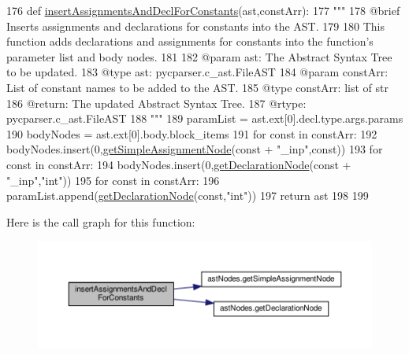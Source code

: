 \begin{DoxyCode}
176 \textcolor{keyword}{def }\hyperlink{namespaceutils_a694fa47d55cc41b3f9e86ab2f90e98f3}{insertAssignmentsAndDeclForConstants}(ast,constArr):
177     \textcolor{stringliteral}{"""
}
178 \textcolor{stringliteral}{    @brief Inserts assignments and declarations for constants into the AST.
}
179 \textcolor{stringliteral}{
}
180 \textcolor{stringliteral}{    This function adds declarations and assignments for constants into the function's parameter list and
       body nodes.
}
181 \textcolor{stringliteral}{
}
182 \textcolor{stringliteral}{    @param ast: The Abstract Syntax Tree to be updated.
}
183 \textcolor{stringliteral}{    @type ast: pycparser.c\_ast.FileAST
}
184 \textcolor{stringliteral}{    @param constArr: List of constant names to be added to the AST.
}
185 \textcolor{stringliteral}{    @type constArr: list of str
}
186 \textcolor{stringliteral}{    @return: The updated Abstract Syntax Tree.
}
187 \textcolor{stringliteral}{    @rtype: pycparser.c\_ast.FileAST
}
188 \textcolor{stringliteral}{    """}
189     paramList = ast.ext[0].decl.type.args.params
190     bodyNodes = ast.ext[0].body.block\_items
191     \textcolor{keywordflow}{for} const \textcolor{keywordflow}{in} constArr:
192         bodyNodes.insert(0,\hyperlink{namespaceastNodes_a2403f5d006e54f20e614226280cb6cbc}{getSimpleAssignmentNode}(const + \textcolor{stringliteral}{"\_inp"},const))
193     \textcolor{keywordflow}{for} const \textcolor{keywordflow}{in} constArr:
194         bodyNodes.insert(0,\hyperlink{namespaceastNodes_ae5e5c7f09a1586002b20db6d72f6d30b}{getDeclarationNode}(const + \textcolor{stringliteral}{"\_inp"},\textcolor{stringliteral}{"int"}))
195     \textcolor{keywordflow}{for} const \textcolor{keywordflow}{in} constArr:
196         paramList.append(\hyperlink{namespaceastNodes_ae5e5c7f09a1586002b20db6d72f6d30b}{getDeclarationNode}(const,\textcolor{stringliteral}{"int"}))
197     \textcolor{keywordflow}{return} ast
198 
199 
\end{DoxyCode}
Here is the call graph for this function\+:\nopagebreak
\begin{figure}[H]
\begin{center}
\leavevmode
\includegraphics[width=350pt]{namespaceutils_a694fa47d55cc41b3f9e86ab2f90e98f3_cgraph}
\end{center}
\end{figure}
